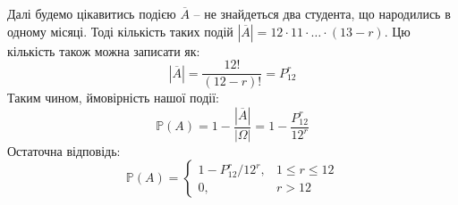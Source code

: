 \documentclass[oneside,solution]{karazin-prob-theory-assign}
\begin{document}
Далі будемо цікавитись подією $\overline{A}$ -- не знайдеться два студента, що народились в одному місяці. Тоді кількість таких подій $|\overline{A}| = 12 \cdot 11 \cdot \dots \cdot (13-r)$. Цю кількість також можна записати як:
\begin{equation}
    |\overline{A}| = \frac{12!}{(12-r)!} = P_{12}^r
\end{equation}
Таким чином, ймовірність нашої події:
\begin{equation}
    \mathbb{P}(A) = 1 - \frac{|\overline{A}|}{|\Omega|} = 1 - \frac{P_{12}^r}{12^r}
\end{equation}
Остаточна відповідь:
\begin{equation}
    \mathbb{P}(A) = \begin{cases}
        1-P_{12}^r/12^r, & 1 \leq r \leq 12 \\
        0, & r > 12
    \end{cases}
\end{equation}
\end{document}
